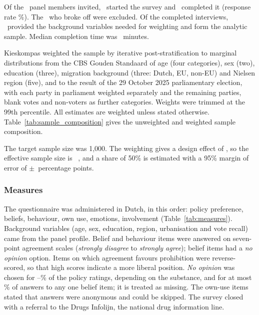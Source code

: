 Of the \nInvited\ panel members invited, \nStarted\ started the survey and \nCompleted\ completed it
(response rate \responseRate\%). The \nBrokeOff\ who broke off were excluded. Of the completed
interviews, \nAnalytic\ provided the background variables needed for weighting and form the analytic
sample. Median completion time was \medianMinutes\ minutes.

Kieskompas weighted the sample by iterative post-stratification to marginal distributions from the CBS
Gouden Standaard of age (four categories), sex (two), education (three), migration background
(three: Dutch, EU, non-EU) and Nielsen region (five), and to the result of the 29 October 2025
parliamentary election, with each party in parliament weighted separately and the remaining parties,
blank votes and non-voters as further categories. Weights were trimmed at the 99th percentile. All
estimates are weighted unless stated otherwise. Table~\ref{tab:sample_composition} gives the unweighted and weighted
sample composition.



The target sample size was 1{,}000. The weighting gives a design effect of \designEffect, so the
effective sample size is \nEff\ \parencite{kish1965}, and a share of 50\% is estimated with a 95\%
margin of error of $\pm$\marginError\ percentage points.

\subsubsection{Measures}

The questionnaire was administered in Dutch, in this order: policy preference, beliefs, behaviour,
own use, emotions, involvement (Table~\ref{tab:measures}). Background variables (age, sex, education,
region, urbanisation and vote recall) came from the panel profile. Belief and behaviour items were
answered on seven-point agreement scales (\emph{strongly disagree} to \emph{strongly agree}); belief
items had a \emph{no opinion} option. Items on which agreement favours prohibition were
reverse-scored, so that high scores indicate a more liberal position. \emph{No opinion} was chosen
for \noOpPolicyMin--\noOpPolicyMax\% of the policy ratings, depending on the substance, and for at
most \noOpBeliefMax\% of answers to any one belief item; it is treated as missing. The own-use items
stated that answers were anonymous and could be skipped. The survey closed with a referral to the
Drugs Infolijn, the national drug information line.


